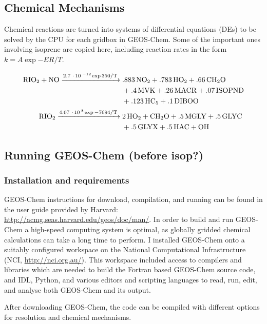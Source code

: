   \subsection{Chemical Mechanisms}
  \label{Model:GC:Mechanisms}
    Chemical reactions are turned into systems of differential equations (DEs) to be solved by the CPU for each gridbox in GEOS-Chem.
    Some of the important ones involving isoprene are copied here, including reaction rates in the form $ k = A \exp{-ER/T} $.
    
    \begin{align} \begin{split}
      \label{Model:GC:Mechanisms:eqn_mechanisms}
      \ce{
        RIO2 + NO ->[2.7*10^{-12} \exp{350/T}] & .883NO2 + .783HO2 + .66CH2O \\
         & + .4MVK + .26MACR + .07ISOPND \\
         & + .123HC5 + .1DIBOO \\
        RIO2 ->[4.07*10^{8} \exp{-7694/T}] & 2HO2 + CH2O + .5MGLY + .5GLYC \\
         & + .5GLYX + .5HAC + OH
      }
%      
    \end{split} \end{align}
  
  \subsection{Running GEOS-Chem (before isop?)}
  \label{Model:GC:running}
    \subsubsection{Installation and requirements}
      GEOS-Chem instructions for download, compilation, and running can be found in the user guide provided by Harvard: \url{http://acmg.seas.harvard.edu/geos/doc/man/}.
      In order to build and run GEOS-Chem a high-speed computing system is optimal, as globally gridded chemical calculations can take a long time to perform.
      I installed GEOS-Chem onto a suitably configured workspace on the National Computational Infrastructure (NCI, \url{http://nci.org.au/}). 
      This workspace included access to compilers and libraries which are needed to build the Fortran based GEOS-Chem source code, and IDL, Python, and various editors and scripting languages to read, run, edit, and analyse both GEOS-Chem and its output.
        
      After downloading GEOS-Chem, the code can be compiled with different options for resolution and chemical mechanisms.
